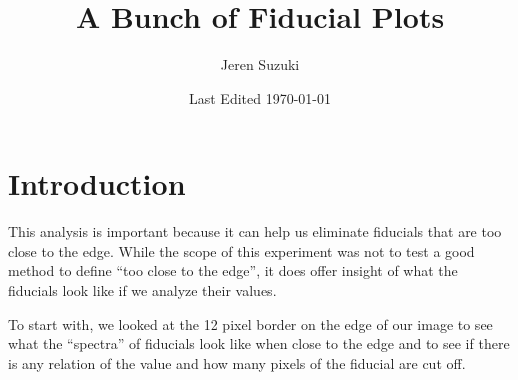 \documentclass[10pt]{scrartcl}
\title{A Bunch of Fiducial Plots}
\author{Jeren Suzuki}
\date{Last Edited \today}
\begin{document}
\maketitle
{}
\tableofcontents
\newpage
{}

\section{Introduction} %
\label{sec:introduction}

This analysis is important because it can help us eliminate fiducials that are too close to the edge. While the scope of this experiment was not to test a good method to define ``too close to the edge'', it does offer insight of what the fiducials look like if we analyze their values.

To start with, we looked at the 12 pixel border on the edge of our image to see what the ``spectra'' of fiducials look like when close to the edge and to see if there is any relation of the value and how many pixels of the fiducial are cut off. 

\end{document}
